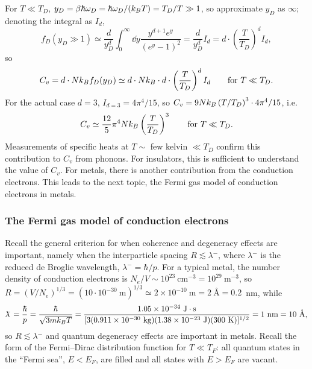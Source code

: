 For $T\ll T_D$, $y_D = \beta\hbar\omega_D = \hbar\omega_D/(k_{B} T) = T_D/T\gg 1$, so approximate $y_D$ as $\infty$; denoting
the integral as $I_d$,
\begin{equation}
  f_D(y_D\gg 1)\simeq\frac{d}{y_D^d}\int_0^\infty\dd y\frac{y^{d+1}e^y}{(e^y-1)^2} = \frac{d}{y_D^d}I_d = d\cdot\left(\frac{T}{T_D}\right)^dI_d,
\end{equation}
so
\begin{equation}
  C_v = d\cdot Nk_{B} f_D(y_D)\simeq d\cdot Nk_{B}\cdot d\cdot\left(\frac{T}{T_D}\right)^dI_d\qquad\text{for } T\ll T_D .
\end{equation}
For the actual case $d = 3$, $I_{d=3} = 4\pi^4/15$, so $C_v = 9Nk_{B}\left(T/T_D\right)^3\cdot4\pi^4/15$, i.e.
\begin{equation}
  C_v\simeq\frac{12}{5}\pi^4Nk_{B}\left(\frac{T}{T_D}\right)^3\qquad\text{for } T\ll T_D .
\end{equation}
Measurements of specific heats at $T\sim$ few kelvin $\ll T_D$ confirm this contribution to $C_v$ from phonons. For insulators, this is
sufficient to understand the value of $C_v$. For metals, there is another contribution from the conduction electrons. This leads to the
next topic, the Fermi gas model of conduction electrons in metals.

\subsubsection*{The Fermi gas model of conduction electrons}

Recall the general criterion for when coherence and degeneracy effects are important, namely when the interparticle spacing
$R\lesssim\lambda\!\!\!^-$, where $\lambda\!\!\!^-$ is the reduced de Broglie wavelength, $\lambda\!\!\!^- = \hbar/p$. For a typical
metal, the number density of conduction electrons is $N_e/V\sim 10^{23}\ \text{cm}^{-3} = 10^{29}\ \text{m}^{-3}$, so
$R = \left(V/N_e\right)^{1/3} = (10\cdot 10^{-30}\ \text{m})^{1/3}\simeq 2\times 10^{-10}\ \text{m} = 2\ \text{\AA} = 0.2$~nm, while
\begin{equation}
  \lambda\!\!\!^- = \frac{\hbar}{p} = \frac{\hbar}{\sqrt{3m\kB T}}
  = \frac{1.05\times 10^{-34}\ \text{J}\cdot\text{s}}{[3(0.911\times 10^{-30}\ \text{kg})(1.38\times 10^{-23}\ \text{J})(300\ \text{K})]^{1/2}}
  = 1\ \text{nm} = 10\ \text{\AA},
\end{equation}
so $R\lesssim\lambda\!\!\!^-$ and quantum degeneracy effects are important in metals. Recall the form of the Fermi--Dirac distribution
function for $T\ll T_F$: all quantum states in the ``Fermi sea'', $E<E_F$, are filled and all states with $E>E_F$ are vacant.

